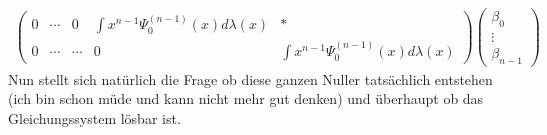 \begin{solution}
\begin{align*}
\begin{pmatrix}
            0 & \cdots &  0 & \int x^{n-1}\Psi_0^{(n-1)}(x)d\lambda(x) & * \\
            0 & \cdots & \cdots & 0 & \int x^{n-1}\Psi_0^{(n-1)}(x)d\lambda(x)
        \end{pmatrix}
        \begin{pmatrix}
            \beta_0\\
            \vdots\\
            \beta_{n-1}
        \end{pmatrix}
    \end{align*}
    Nun stellt sich natürlich die Frage ob diese ganzen Nuller tatsächlich entstehen (ich bin schon müde und kann nicht mehr gut denken) und überhaupt ob das Gleichungssystem lösbar ist.
\end{solution}
